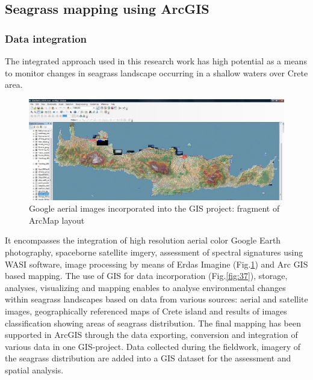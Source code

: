 \documentclass[10pt, a4paper]{article}
\begin{document}
\subsection{Seagrass mapping using ArcGIS}

\subsubsection{Data integration}
The integrated approach used in this research work has high potential as a means to monitor changes
in seagrass landscape occurring in a shallow waters over Crete area.

\begin{figure}
\begin{center}
\includegraphics[scale=0.25]{Fig-37.jpg}
\caption{Google aerial images incorporated into the GIS project: fragment of ArcMap layout}
\label{fig:39}
\end{center}
\end{figure}

It encompasses the integration of
high resolution aerial color Google Earth photography, spaceborne satellite imgery, assessment of
spectral signatures using WASI software, image processing by means of Erdas Imagine (Fig.\ref{fig:39}) and Arc GIS
based mapping. The use of GIS for data incorporation (Fig.\ref{fig:37}), storage, analyses, visualizing and mapping
enables to analyse environmental changes within seagrass landscapes based on data from various
sources: aerial and satellite images, geographically referenced maps of Crete island and results of
images classification showing areas of seagrass distribution.
The final mapping has been supported in ArcGIS through the data exporting, conversion and
integration of various data in one GIS-project. Data collected during the fieldwork, imagery
of the seagrass distribution are added into a GIS dataset for the assessment and spatial analysis.
\end{document}
